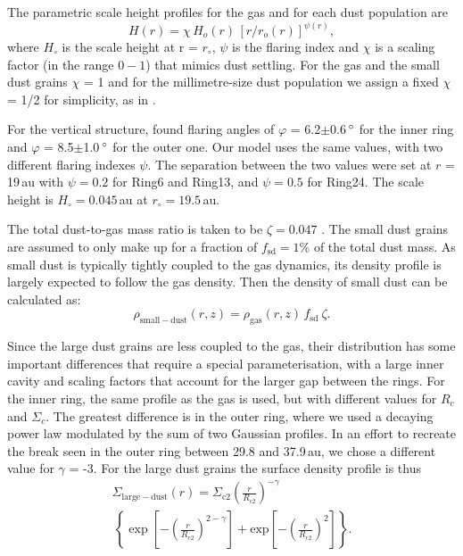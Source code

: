 \documentclass[letters,usenatbib,times]{mnras}
\begin{document}
The parametric scale height profiles for the gas and for each dust population are 
\begin{equation}
    \label{scale}
  H(r)=\chi \, H_{o}(r) \, [r/r_{o}(r)]^{\psi(r)},
\end{equation}
where $H_\circ$ is the scale height at r = $r_\circ$, $\psi$ is the flaring index and $\chi$ is a scaling factor (in the range $0-1$) that mimics dust settling. For the gas and the small dust grains $\chi$ = 1 and for the millimetre-size dust population we assign a fixed $\chi$ = 1/2 for simplicity, as in \citet{Rosenfeld_2013}.

For the vertical structure, \citet{dOrazi} found flaring angles of $\varphi$ = 6.2$\pm$0.6\,$\hbox{$^\circ$}$ for the inner ring and $\varphi$ = 8.5$\pm$1.0\,$\hbox{$^\circ$}$ for the outer one. Our model uses the same values, with two different flaring indexes $\psi$. The separation between the two values were set at $r$ = 19\,au with $\psi=0.2$ for Ring6 and Ring13, and $\psi=0.5$ for Ring24. The scale height is $H_\circ = 0.045$\,au at $r_\circ = 19.5$\,au.

The total dust-to-gas mass ratio is taken to be $\zeta = 0.047$ \citep[as in][]{Rosenfeld_2013}. The small dust grains are assumed to only make up for a fraction of $f_\mathrm{sd}=1\%$ of the total dust mass. As small dust is typically tightly coupled to the gas dynamics, its density profile is largely expected to follow the gas density. Then the density of small dust can be calculated as:
\begin{equation}
\rho_{\mathrm{small-dust}}(r,z)=\rho_{\mathrm{gas}}(r,z)\, f_{\mathrm{sd}} \: \zeta .
\end{equation}

Since the large dust grains are less coupled to the gas, their distribution has some important differences that require a special parameterisation, with a large inner cavity and scaling factors that account for the larger gap between the rings. For the inner ring, the same profile as the gas is used, but with different values for $R_c$ and $\Sigma_c$. The greatest difference is in the outer ring, where we used a decaying power law modulated by the sum of two Gaussian profiles. In an effort to recreate the break seen in the outer ring between 29.8 and 37.9\,au, we chose a different value for $\gamma$ = -3. For the large dust grains the surface density profile is thus
\begin{multline}
  \Sigma_{\mathrm{large-dust}}(r) = \Sigma_{\mathrm{c}2} \left(\frac{r}{R_{\mathrm{c}2}}\right)^{-\gamma} \\ \, \left\{ \exp\left[-\left(\frac{r}{R_{\mathrm{c}2}}\right)^{2-\gamma}\right] + \mathrm{exp}\left[-\left(\frac{r}{R_{\mathrm{c}2}}\right)^{2}\right]\right\}.
\end{multline}
\end{document}
